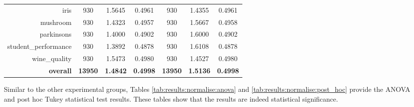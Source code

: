 \begin{table}[htbp]
{\begin{tabular}{rcccccc}
			iris                               & 930                                        & 1.5645                                                                             & 0.4961          & 930                               & \cellcolor[rgb]{ .776,  .937,  .808}\textcolor[rgb]{ 0,  .38,  0}{1.4355} & 0.4961          \\
			mushroom                           & 930                                        & \cellcolor[rgb]{ .776,  .937,  .808}\textcolor[rgb]{ 0,  .38,  0}{1.4323}          & 0.4957          & 930                               & 1.5667                                                                    & 0.4958          \\
			parkinsons                         & 930                                        & \cellcolor[rgb]{ .776,  .937,  .808}\textcolor[rgb]{ 0,  .38,  0}{1.4000}          & 0.4902          & 930                               & 1.6000                                                                    & 0.4902          \\
			student\_performance               & 930                                        & \cellcolor[rgb]{ .776,  .937,  .808}\textcolor[rgb]{ 0,  .38,  0}{1.3892}          & 0.4878          & 930                               & 1.6108                                                                    & 0.4878          \\
			wine\_quality                      & 930                                        & 1.5473                                                                             & 0.4980          & 930                               & \cellcolor[rgb]{ .776,  .937,  .808}\textcolor[rgb]{ 0,  .38,  0}{1.4527} & 0.4980          \\
			\midrule
			\textbf{overall}                   & \textbf{13950}                             & \cellcolor[rgb]{ .776,  .937,  .808}\textcolor[rgb]{ 0,  .38,  0}{\textbf{1.4842}} & \textbf{0.4998} & \textbf{13950}                    & \textbf{1.5136}                                                           & \textbf{0.4998} \\
		\end{tabular}%
	}
\end{table}%

Similar to the other experimental groups, Tables \ref{tab:results:normalise:anova} and \ref{tab:results:normalise:post_hoc} provide the ANOVA and post hoc Tukey statistical test results. These tables show that the results are indeed statistical significance.



